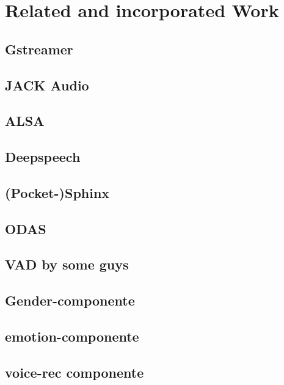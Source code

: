 
\chapter{Related and incorporated Work}

\section{Gstreamer}

\section{JACK Audio}

\section{ALSA}%

\section{Deepspeech}

\section{(Pocket-)Sphinx}

\section{ODAS}

\section{VAD by some guys}

\section{Gender-componente}

\section{emotion-componente}

\section{voice-rec componente}

